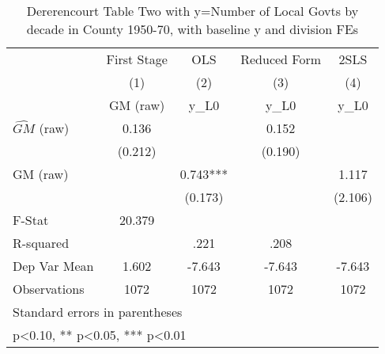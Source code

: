 \begin{table}[htbp]\centering
\def\sym#1{\ifmmode^{#1}\else\(^{#1}\)\fi}
\caption{Dererencourt Table Two with y=Number of Local Govts by decade in County 1950-70, with baseline y and division FEs}
\begin{tabular}{l*{4}{c}}
\toprule
                    & First Stage   &         OLS   &Reduced Form   &        2SLS   \\
                    &\multicolumn{1}{c}{(1)}&\multicolumn{1}{c}{(2)}&\multicolumn{1}{c}{(3)}&\multicolumn{1}{c}{(4)}\\
                    &\multicolumn{1}{c}{GM  (raw)}&\multicolumn{1}{c}{y\_L0}&\multicolumn{1}{c}{y\_L0}&\multicolumn{1}{c}{y\_L0}\\
\midrule
$\hat{GM}$ (raw)    &       0.136   &               &       0.152   &               \\
                    &     (0.212)   &               &     (0.190)   &               \\
\addlinespace
GM  (raw)           &               &       0.743***&               &       1.117   \\
                    &               &     (0.173)   &               &     (2.106)   \\
\midrule
F-Stat              &      20.379   &               &               &               \\
R-squared           &               &        .221   &        .208   &               \\
Dep Var Mean        &       1.602   &      -7.643   &      -7.643   &      -7.643   \\
Observations        &        1072   &        1072   &        1072   &        1072   \\
\bottomrule
\multicolumn{5}{l}{\footnotesize Standard errors in parentheses}\\
\multicolumn{5}{l}{\footnotesize * p<0.10, ** p<0.05, *** p<0.01}\\
\end{tabular}
\end{table}
